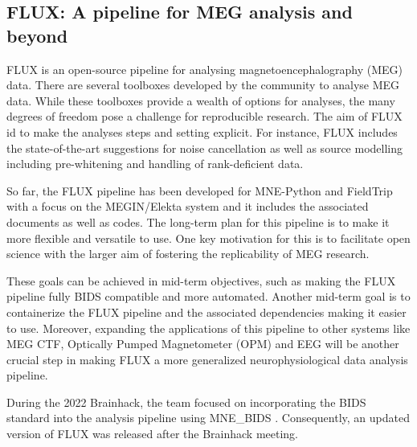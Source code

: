 \documentclass[../main.tex]{subfiles}
\begin{document}
\subsection{FLUX: A pipeline for MEG analysis and beyond}


FLUX \citep{Ferrante2022} is an open-source pipeline for analysing magnetoencephalography (MEG) data. There are several toolboxes developed by the community to analyse MEG data. While these toolboxes provide a wealth of options for analyses, the many degrees of freedom pose a challenge for reproducible research. The aim of FLUX id to make the analyses steps and setting explicit. For instance, FLUX includes the state-of-the-art suggestions for noise cancellation as well as source modelling including pre-whitening and handling of rank-deficient data.

So far, the FLUX pipeline has been developed for MNE-Python \citep{Gramfort2014} and FieldTrip \citep{Oostenveld2011} with a focus on the MEGIN/Elekta system and it includes the associated documents as well as codes.
The long-term plan for this pipeline is to make it more flexible and versatile to use. One key motivation for this is to facilitate open science with the larger aim of fostering the replicability of MEG research.

These goals can be achieved in mid-term objectives, such as making the FLUX pipeline fully BIDS compatible and more automated. Another mid-term goal is to containerize the FLUX pipeline and the associated dependencies making it easier to use. Moreover, expanding the applications of this pipeline to other systems like MEG CTF, Optically Pumped Magnetometer (OPM) and EEG will be another crucial step in making FLUX a more generalized neurophysiological data analysis pipeline.

During the 2022 Brainhack, the team focused on incorporating the BIDS standard into the analysis pipeline using MNE_BIDS \citep{Appelhoff2019}. Consequently, an updated version of FLUX was released after the Brainhack meeting.
\end{document}

